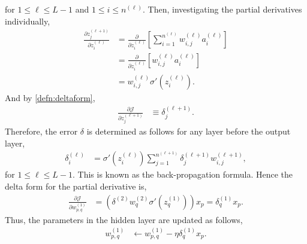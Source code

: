 for $1\leq \ell\leq L-1$ and $1\leq i \leq n^{(\ell)}$. Then, investigating the partial derivatives individually,
\begin{align*}
     \frac{\partial z^{(\ell+1)}_{j}}{\partial z^{(\ell)}_{i}} 
     &= \frac{\partial}{\partial z^{(\ell)}_{i}} \left[ \sum_{i=1}^{n^{(\ell)}} w_{i,j}^{(\ell)}a^{(\ell)}_i \right] \\
     &= \frac{\partial}{\partial z^{(\ell)}_{i}} \left[ w_{i,j}^{(\ell)}a^{(\ell)}_i \right] \\
     &= w_{i,j}^{(\ell)} \sigma'(z^{(\ell)}_{i}).
\end{align*}
And by \cref{defn:deltaform}, 
\begin{align*}
     \frac{\partial \mathcal{J}}{\partial z^{(\ell+1)}_{j}} &\equiv \delta_j^{(\ell+1)}.
\end{align*}
Therefore, the error $\delta$ is determined as follows for any layer before the output layer,
\begin{align*}
    \delta^{(\ell)}_i &= \sigma'(z_i^{(\ell)}) \sum_{j = 1}^{n^{(\ell+1)}} \delta_j^{(\ell+1)}w_{i,j}^{(\ell+1)},
\end{align*}
for $1\leq \ell \leq L-1$. This is known as the back-propagation formula. Hence the delta form for the partial derivative is,
\begin{align}
    \frac{\partial \mathcal{J}}{\partial w^{(1)}_{p,q}} 
    &=\left(\delta^{(2)} w^{(2)}_{q} \sigma'(z^{(1)}_q)\right) x_p 
    =\delta^{(1)}_q x_p. \label{eq:hellokitty}
\end{align}
Thus, the parameters in the hidden layer are updated as follows, 
\begin{align*}
    w^{(1)}_{p,q}
    &\leftarrow  w^{(1)}_{p,q} - \eta \delta^{(1)}_q x_p.
\end{align*}
